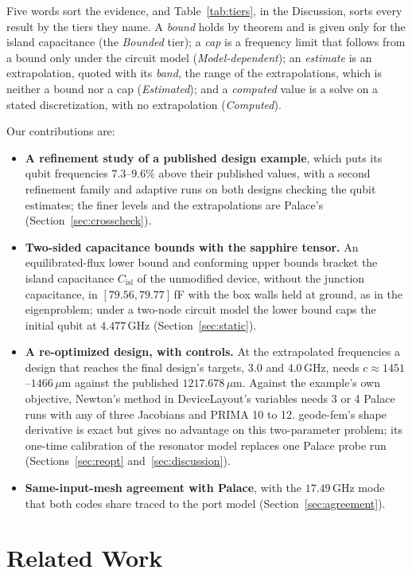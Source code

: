 \documentclass{anvil-paper}
\newcommand{\Cisl}{C_{\mathrm{isl}}}
\begin{document}
Five words sort the evidence, and Table~\ref{tab:tiers}, in the
Discussion, sorts every result by the tiers they name. A \emph{bound}
holds by theorem and is given only for the island capacitance (the
\emph{Bounded} tier); a \emph{cap} is a frequency limit that follows from
a bound only under the circuit model (\emph{Model-dependent}); an
\emph{estimate} is an extrapolation, quoted with its \emph{band}, the
range of the extrapolations, which is neither a bound nor a cap
(\emph{Estimated}); and a \emph{computed} value is a solve on a stated
discretization, with no extrapolation (\emph{Computed}).

Our contributions are:
\begin{itemize}
  \item \textbf{A refinement study of a published design example}, which
    puts its qubit frequencies $7.3$--$9.6\%$ above their published values, with a
    second refinement family and adaptive runs on both designs checking
    the qubit estimates; the finer levels and the extrapolations are
    Palace's (Section~\ref{sec:crosscheck}).
  \item \textbf{Two-sided capacitance bounds with the sapphire tensor.}
    An equilibrated-flux lower bound and conforming upper bounds bracket
    the island capacitance $\Cisl$ of the unmodified device, without the
    junction capacitance, in $[79.56, 79.77]$\,fF with the box walls held
    at ground, as in the eigenproblem; under a two-node circuit model the
    lower bound caps the initial qubit at $4.477$\,GHz
    (Section~\ref{sec:static}).
  \item \textbf{A re-optimized design, with controls.} At the extrapolated
    frequencies a design that reaches the final design's targets, $3.0$
    and $4.0$\,GHz, needs $c \approx 1451$--$1466\,\mu$m against the
    published $1217.678\,\mu$m. Against
    the example's own objective, Newton's method in DeviceLayout's
    variables needs 3 or 4 Palace runs with any of three Jacobians and
    PRIMA 10 to 12. geode-fem's shape derivative is exact but gives no
    advantage on this two-parameter problem; its one-time calibration of
    the resonator model replaces one Palace probe run
    (Sections~\ref{sec:reopt} and~\ref{sec:discussion}).
  \item \textbf{Same-input-mesh agreement with Palace}, with the
    $17.49$\,GHz mode that both codes share traced to the port model
    (Section~\ref{sec:agreement}).
\end{itemize}

\section{Related Work}
\label{sec:related}
\end{document}
